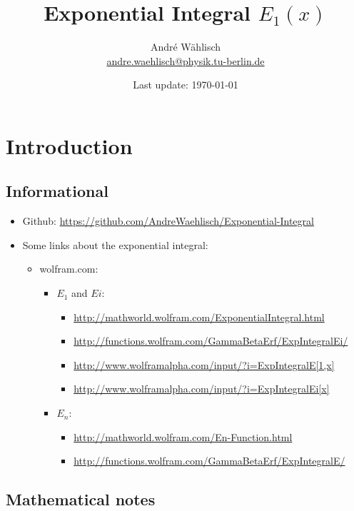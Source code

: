 \documentclass[bibliography=totocnumbered]{scrartcl}
\title{Exponential Integral $E_1\left(x\right)$}
\author{André Wählisch\\\href{mailto:andre.waehlisch@physik.tu-berlin.de}{andre.waehlisch@physik.tu-berlin.de}}
\date{Last update: \today}
\begin{document}
	\maketitle
	\tableofcontents
	\clearpage

	\section{Introduction}

	\subsection{Informational}

	\begin{itemize}
		\item Github: \url{https://github.com/AndreWaehlisch/Exponential-Integral}
		\item Some links about the exponential integral:
		\begin{itemize}
			\item wolfram.com:
			\begin{itemize}
				\item $E_1$ and $Ei$:
				\begin{itemize}
					\item \url{http://mathworld.wolfram.com/ExponentialIntegral.html}
					\item \url{http://functions.wolfram.com/GammaBetaErf/ExpIntegralEi/}
					\item \url{http://www.wolframalpha.com/input/?i=ExpIntegralE[1,x]}
					\item \url{http://www.wolframalpha.com/input/?i=ExpIntegralEi[x]}
				\end{itemize}
				\item $E_n$:
				\begin{itemize}
					\item \url{http://mathworld.wolfram.com/En-Function.html}
					\item \url{http://functions.wolfram.com/GammaBetaErf/ExpIntegralE/}
				\end{itemize}
			\end{itemize}
		\end{itemize}
	\end{itemize}

	\subsection{Mathematical notes}
\end{document}
